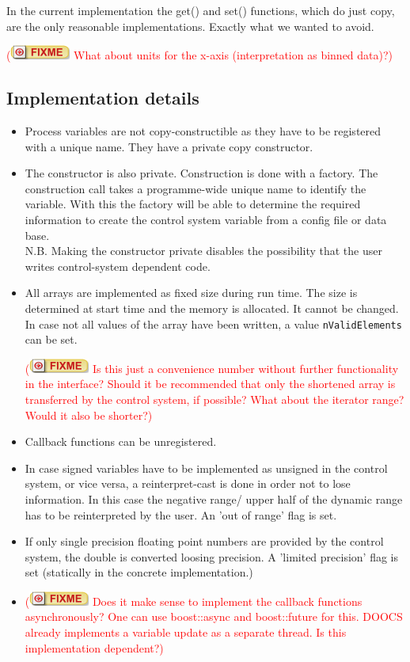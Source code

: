 \documentclass[11pt,a4paper]{scrartcl}
\newcounter{nFixmes}
\newcommand{\fixme}[1]{\addtocounter{nFixmes}{1}\textcolor{red}{(\includegraphics[height=2ex]{fixme} #1)}\xspace}
\begin{document}
In the current implementation the get() and set() functions, which do just copy, are the only reasonable
implementations. Exactly what we wanted to avoid.

\fixme{What about units for the x-axis (interpretation as binned data)?}


\subsection{Implementation details}

\begin{itemize}
\item Process variables are not copy-constructible as they have to be
  registered with a unique name. They have a private copy constructor. 
\item The constructor is also private. Construction is done with a
  factory. The construction call takes a programme-wide unique name to
  identify the variable. With this the factory will be able to determine the
  required information to create the control system variable from a config
  file or data base.\\
N.B. Making the constructor private disables the possibility that the user
writes control-system dependent code. 
\item All arrays are implemented as fixed size during run time. The size is 
      determined at start time and the memory is allocated. It cannot be changed.
      In case not all values of the array have been written, a value \texttt{nValidElements}
      can be set. \fixme{Is this just a convenience number without further functionality in
      the interface? Should it be recommended that only the shortened array is 
      transferred by the control system, if possible?
      What about the iterator range? Would it also be shorter?}
\item Callback functions can be unregistered.
\item In case signed variables have to be implemented as unsigned in the
  control system, or vice versa, a reinterpret-cast is done in order not to
  lose information. In this case the negative range/ upper half of the dynamic
  range has to be reinterpreted by the user. An 'out of range' flag is set. 
\item If only single precision floating point numbers are provided by the
  control system, the double is converted loosing precision. A 'limited
  precision' flag is set (statically in the concrete implementation.)
\item \fixme{Does it make sense to implement the callback functions asynchronously? One can use 
boost::async and boost::future for this. DOOCS already implements a variable update as a separate thread.
Is this implementation dependent?}
\end{itemize}
\end{document}
